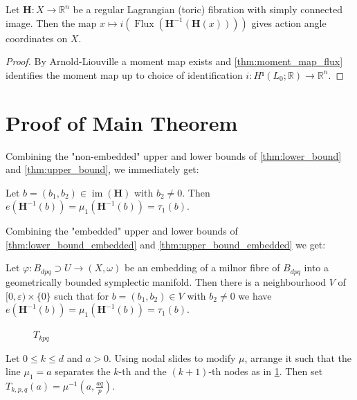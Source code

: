 \documentclass[12pt,a4paper,draft]{scrartcl}
\DeclareMathOperator{\im}{im}
\DeclareMathOperator{\Flux}{Flux}
\begin{document}
\begin{corollary}
  Let $\symbf{H} \colon X → ℝ^n$ be a regular Lagrangian (toric) fibration with simply connected image. Then the map $x ↦ i(\Flux(\symbf{H}^{-1}(\symbf{H}(x))))$ gives action angle coordinates on $X$.
\end{corollary}
\begin{proof}
  By Arnold-Liouville a moment map exists and \cref{thm:moment_map_flux} identifies the moment map up to choice of identification $i \colon H¹(L_0;ℝ) → ℝ^n$.
\end{proof}

\section{Proof of Main Theorem}

Combining the "non-embedded" upper and lower bounds of \cref{thm:lower_bound} and \cref{thm:upper_bound}, we immediately get:

\begin{theorem}
  \label{thm:displacement_energy}
  Let $b=(b_1,b_2) ∈ \im(\symbf{H})$ with $b_2 ≠ 0$. Then $e(\symbf{H}^{-1}(b)) = μ_1(\symbf{H}^{-1}(b)) = τ_1(b)$.
\end{theorem}

Combining the "embedded" upper and lower bounds of \cref{thm:lower_bound_embedded} and \cref{thm:upper_bound_embedded} we get:

\begin{theorem}
  \label{thm:displacement_energy_embedded}
  Let $φ \colon B_{dpq} ⊃ U → (X,ω)$ be an embedding of a milnor fibre of $B_{dpq}$ into a geometrically bounded symplectic manifold. Then there is a neighbourhood $V$ of $[0,ε) × \{0\}$ such that for $b = (b_1,b_2) ∈ V$ with $b_2 ≠ 0$ we have $e(\symbf{H}^{-1}(b)) = μ_1(\symbf{H}^{-1}(b)) = τ_1(b)$.
\end{theorem}

\begin{figure}
  \centering
  \caption{$T_{kpq}$}
  \label{fig:tkpq_def}
\end{figure}

\begin{definition}
  Let $0 ≤ k ≤ d$ and $a>0$.
  Using nodal slides to modify $μ$, arrange it such that the line $μ_1 = a$ separates the $k$-th and the $(k+1)$-th nodes as in \cref{fig:tkpq_def}.
  Then set $T_{k,p,q}(a) = μ^{-1}(a,\frac{aq}{p})$.
\end{definition}
\end{document}
